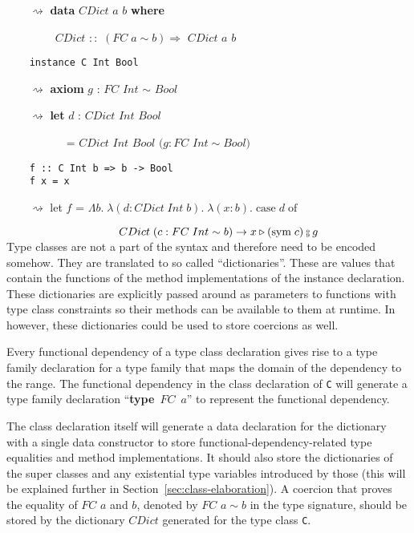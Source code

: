 $\qquad\rightsquigarrow$ \textbf{data} $CDict$ $a$ $b$ \textbf{where}

$\qquad\qquad$ $CDict$ $::$ $(FC \; a \sim b)
\Rightarrow$ $CDict$ $a$ $b$

\begin{verbatim}
    instance C Int Bool
\end{verbatim}

$\qquad\rightsquigarrow$ \textbf{axiom} $g$ : $FC$ $Int$ $\sim$ $Bool$

$\qquad\rightsquigarrow$ \textbf{let} $d$ : $CDict$ $Int$ $Bool$

$\qquad\qquad\quad$ = $CDict$ $Int$ $Bool$ $(g : FC$ $Int \sim Bool)$

\begin{verbatim}
    f :: C Int b => b -> Bool
    f x = x
\end{verbatim}

$\qquad\rightsquigarrow$ let $f$ = $\Lambda b. \; \lambda (d : CDict \; Int \;
b). \;\lambda (x : b). \; \text{case} \; d \; \text{of}$

$\hspace{3.5cm} CDict \; (c : FC \; Int \sim b ) \rightarrow x \triangleright
(\text{sym} \; c) \fctrans g$
\\

Type classes are not a part of the \systemfc syntax and therefore need to be
encoded somehow. They are translated to so called ``dictionaries''.  These are
values that contain the functions of the method implementations of the instance
declaration. These dictionaries are explicitly passed around as parameters to
functions with type class constraints so their methods can be available to them
at runtime. In \systemfc however, these dictionaries could be used to store
coercions as well.

Every functional dependency of a type class declaration gives rise to a type
family declaration for a type family that maps the domain of the dependency to
the range.  The functional dependency in the class declaration of \texttt{C}
will generate a type family declaration ``\textbf{type}~$FC$~$a$'' to represent
the functional dependency.

The class declaration itself will generate a data declaration for the dictionary
with a single data constructor to store functional-dependency-related type
equalities and method implementations. It should also store the dictionaries of
the super classes and any existential type variables introduced by those (this
will be explained further in Section~\ref{sec:class-elaboration}).
A coercion that proves the equality of $FC$ $a$ and $b$, denoted by
$FC$ $a \sim b$ in the type signature, should be stored by the dictionary
$CDict$ generated for the type class \texttt{C}.

